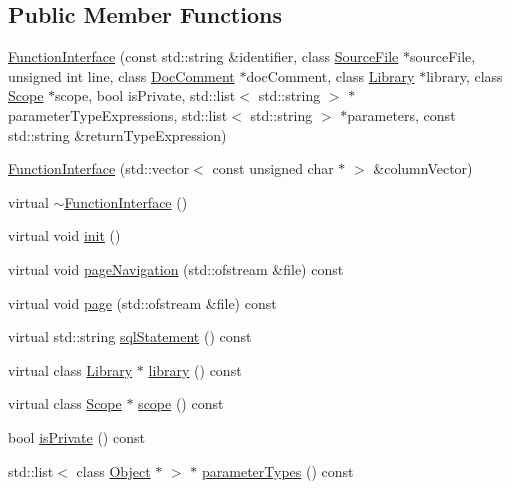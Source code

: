 \subsection*{Public Member Functions}
\begin{CompactItemize}
\item 
\hyperlink{classvjassdoc_1_1FunctionInterface_0cfa512a726b2d035b42f783d02d6b63}{FunctionInterface} (const std::string \&identifier, class \hyperlink{classvjassdoc_1_1SourceFile}{SourceFile} $\ast$sourceFile, unsigned int line, class \hyperlink{classvjassdoc_1_1DocComment}{DocComment} $\ast$docComment, class \hyperlink{classvjassdoc_1_1Library}{Library} $\ast$library, class \hyperlink{classvjassdoc_1_1Scope}{Scope} $\ast$scope, bool isPrivate, std::list$<$ std::string $>$ $\ast$parameterTypeExpressions, std::list$<$ std::string $>$ $\ast$parameters, const std::string \&returnTypeExpression)
\item 
\hyperlink{classvjassdoc_1_1FunctionInterface_0eae365567f49506b31b3f8c860550f2}{FunctionInterface} (std::vector$<$ const unsigned char $\ast$ $>$ \&columnVector)
\item 
virtual \hyperlink{classvjassdoc_1_1FunctionInterface_35cab1ce58b14423de2f6c183f1ba9d8}{$\sim$FunctionInterface} ()
\item 
virtual void \hyperlink{classvjassdoc_1_1FunctionInterface_3b988163d8012beac222b27f80484242}{init} ()
\item 
virtual void \hyperlink{classvjassdoc_1_1FunctionInterface_90bd64ed95596db63699df15aa35216e}{pageNavigation} (std::ofstream \&file) const 
\item 
virtual void \hyperlink{classvjassdoc_1_1FunctionInterface_3f5c67bb77822e08047b327f244ec364}{page} (std::ofstream \&file) const 
\item 
virtual std::string \hyperlink{classvjassdoc_1_1FunctionInterface_20b33401bc90587128da6bae1c6986d8}{sqlStatement} () const 
\item 
virtual class \hyperlink{classvjassdoc_1_1Library}{Library} $\ast$ \hyperlink{classvjassdoc_1_1FunctionInterface_c9519495c94b07101fa5e0739775759e}{library} () const 
\item 
virtual class \hyperlink{classvjassdoc_1_1Scope}{Scope} $\ast$ \hyperlink{classvjassdoc_1_1FunctionInterface_3d298257fab6e122f44f07225ee3ab63}{scope} () const 
\item 
bool \hyperlink{classvjassdoc_1_1FunctionInterface_8b81d3aee374ba63043fcc06ec2eec1e}{isPrivate} () const 
\item 
std::list$<$ class \hyperlink{classvjassdoc_1_1Object}{Object} $\ast$ $>$ $\ast$ \hyperlink{classvjassdoc_1_1FunctionInterface_fee3dfa7efa4bf0d40b27155cdfa3089}{parameterTypes} () const 

\end{CompactItemize}
